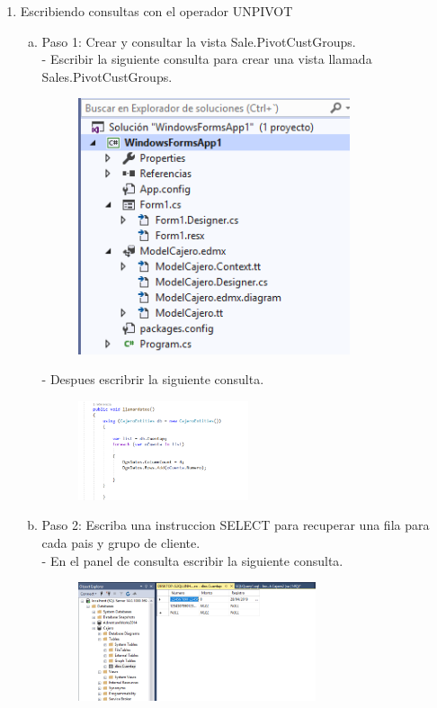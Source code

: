 \begin{enumerate}[1.]
	\item Escribiendo consultas con el operador UNPIVOT
	\begin{enumerate}[a)]
	\item Paso 1: Crear y consultar la vista Sale.PivotCustGroups.\\
		-  Escribir la siguiente consulta para crear una vista llamada Sales.PivotCustGroups.\\
		\begin{figure}[H]
		\begin{center}
		\includegraphics[width=8cm]{./Imagenes/img8}
		\end{center}
		\end{figure}
		-  Despues escribrir la siguiente consulta.
		\begin{figure}[H]
		\begin{center}
		\includegraphics[width=5cm]{./Imagenes/img9}
		\end{center}
		\end{figure}
	\item Paso 2: Escriba una instruccion SELECT para recuperar una fila para cada pais y grupo de cliente.\\
		-  En el panel de consulta escribir la siguiente consulta.\\
		\begin{figure}[H]
		\begin{center}
		\includegraphics[width=7cm]{./Imagenes/img10}

\end{center}
\end{figure}
\end{enumerate}
\end{enumerate}
